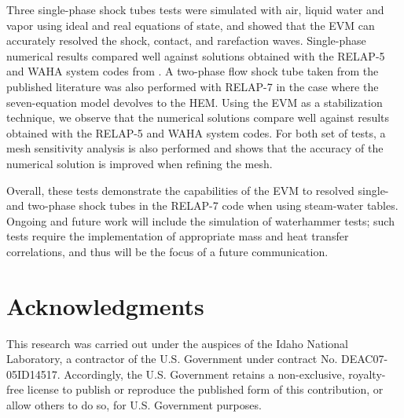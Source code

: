 \documentclass{inputs/mc2015}
\begin{document}
Three single-phase shock tubes tests were simulated with air, liquid water and vapor using ideal and real equations of state, and showed that the EVM can accurately resolved the shock, contact, and rarefaction waves. Single-phase numerical results compared well against solutions obtained with the RELAP-5 and WAHA system codes from \cite{Sokolowski-Koszela}. A two-phase flow shock tube taken from the published literature was also performed with RELAP-7 in the case where the seven-equation model devolves to the HEM. Using the EVM as a stabilization technique, we observe that the numerical solutions compare well against results obtained with the RELAP-5 and WAHA system codes. For both set of tests, a mesh sensitivity analysis is also performed and shows that the accuracy of the numerical solution is improved when refining the mesh. 

Overall, these tests demonstrate the capabilities of the EVM to resolved single- and two-phase shock tubes in the RELAP-7 code when using steam-water tables. Ongoing and future work will include the simulation of waterhammer tests; such tests require the implementation of appropriate mass and heat transfer correlations, and thus will be the focus of a future communication.

\section{Acknowledgments}

This research was carried out under the auspices of the Idaho National Laboratory, a contractor of the U.S. Government under contract No. DEAC07-05ID14517.  Accordingly, the U.S. Government retains a non-exclusive, royalty-free license to publish or reproduce the published form of this contribution, or allow others to do so, for U.S. Government purposes.

\setlength{\baselineskip}{12pt}



\end{document}

